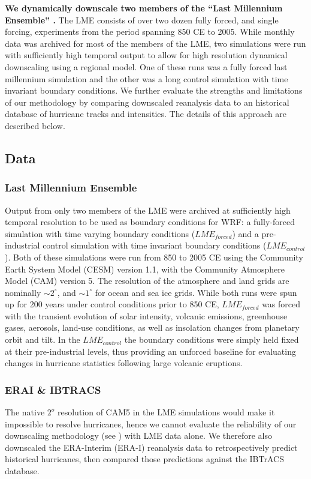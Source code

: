 \documentclass[phd,tocprelim]{cornell}
\begin{document}
\textbf{We dynamically downscale two members of the ``Last Millennium
  Ensemble'' \cite{gcm_lme}.} The LME consists of over two dozen
fully forced, and single forcing, experiments from the period spanning
850 CE to 2005. While monthly data was archived for most of the
members of the LME, two simulations were run with sufficiently high
temporal output to allow for high resolution dynamical downscaling
using a regional model. One of these runs was a fully forced last
millennium simulation and the other was a long control simulation with
time invariant boundary conditions. We further evaluate the strengths
and limitations of our methodology by comparing downscaled reanalysis
data to an historical database of hurricane tracks and
intensities. The details of this approach are described below.

\subsection{Data}
\subsubsection{Last Millennium Ensemble}
Output from only two members of the LME were archived at sufficiently
high temporal resolution to be used as boundary conditions for WRF: a
fully-forced simulation with time varying boundary conditions
($LME_{forced}$) and a pre-industrial control simulation with time
invariant boundary conditions ($LME_{control}$). Both of these
simulations were run from 850 to 2005 CE using the Community Earth
System Model (CESM) version 1.1, with the Community Atmosphere Model
(CAM) version 5. The resolution of the atmosphere and land grids are
nominally ${\sim}2^\circ$, and ${\sim}1^\circ$ for ocean and sea ice
grids. While both runs were spun up for 200 years under control
conditions prior to 850 CE, $LME_{forced}$ was forced with the
transient evolution of solar intensity, volcanic emissions, greenhouse
gases, aerosols, land-use conditions, as well as insolation changes
from planetary orbit and tilt. In the $LME_{control}$ the boundary
conditions were simply held fixed at their pre-industrial levels, thus
providing an unforced baseline for evaluating changes
in hurricane statistics following large volcanic eruptions.

\subsubsection{ERAI \& IBTRACS}
The native $2^o$ resolution of CAM5 in the LME simulations would make
it impossible to resolve hurricanes, hence we cannot evaluate the
reliability of our downscaling methodology (see ) with LME
data alone. We therefore also downscaled the ERA-Interim (ERA-I)
\cite{erai_reanal} reanalysis data to retrospectively predict historical
hurricanes, then compared those predictions against the IBTrACS
\cite{ibtracs} database.
\end{document}
